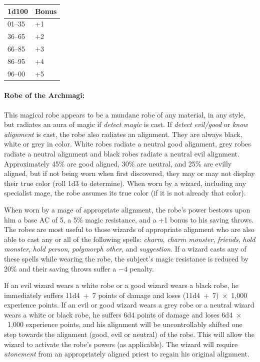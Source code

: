 \begin{multicols}{2}
\noindent
\begin{tabular}{|p{}|p{}|}
\hline
1d100	& Bonus \\
\hline\hline
\rowcolor[gray]{.9}01--35	& +1 \\
36--65	& +2 \\
\rowcolor[gray]{.9}66--85	& +3 \\
86--95	& +4 \\
\rowcolor[gray]{.9}96--00	& +5 \\
\hline
\end{tabular}

\paragraph{Robe of the Archmagi:} This magical robe appears to be a mundane robe of any material, in any style, but radiates an aura of magic if \textit{detect magic} is cast.  If \textit{detect evil/good} or \textit{know alignment} is cast, the robe also radiates an alignment.  They are always black, white or grey in color.  White robes radiate a neutral good alignment, grey robes radiate a neutral alignment and black robes radiate a neutral evil alignment.  Approximately 45\% are good aligned, 30\% are neutral, and 25\% are evilly aligned, but if not being worn when first discovered, they may or may not display their true color (roll 1d3 to determine).  When worn by a wizard, including any specialist mage, the robe assumes its true color (if it is not already that color).

When worn by a mage of appropriate alignment, the robe's power bestows upon him a base AC of 5, a 5\% magic resistance, and a +1 bonus to his saving throws.  The robes are most useful to those wizards of appropriate alignment who are also able to cast any or all of the following spells: \textit{charm}, \textit{charm monster}, \textit{friends}, \textit{hold monster}, \textit{hold person}, \textit{polymorph other}, and \textit{suggestion}.  If a wizard casts any of these spells while wearing the robe, the subject's magic resistance is reduced by 20\% and their saving throws suffer a $-4$ penalty.

If an evil wizard wears a white robe or a good wizard wears a black robe, he immediately suffers 11d4~+~7 points of damage and loses (11d4~+~7)~$\times$~1,000 experience points.  If an evil or good wizard wears a grey robe or a neutral wizard wears a white or black robe, he suffers 6d4 points of damage and loses 6d4~$\times$~1,000 experience points, and his alignment will be uncontrollably shifted one step towards the alignment (good, evil or neutral) of the robe.  This will allow the wizard to activate the robe's powers (as applicable).  The wizard will require \textit{atonement} from an appropriately aligned priest to regain his original alignment.


\end{multicols}
